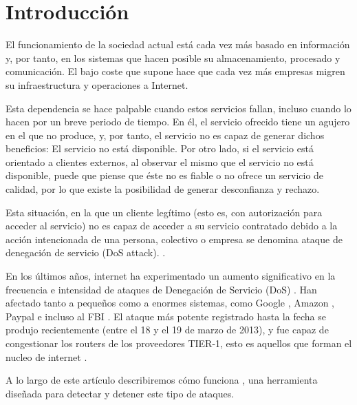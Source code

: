 \section{Introducción}\label{introduccion}
El funcionamiento de la sociedad actual está cada vez más basado en 
información y, por tanto, en los sistemas que hacen posible su almacenamiento, procesado y comunicación. El bajo coste 
que supone hace que cada vez más empresas migren su infraestructura y operaciones a Internet.

Esta dependencia se hace palpable cuando estos servicios fallan, incluso cuando lo hacen por un breve periodo de tiempo. 
En él, el servicio ofrecido tiene un agujero en el que no produce, y, por tanto, el servicio no es capaz de generar 
dichos beneficios: El servicio no está disponible. Por otro lado, si el servicio está orientado a clientes externos, al 
observar el mismo que el servicio no está disponible, puede que piense que éste no es fiable o no ofrece un servicio 
de calidad, por lo que existe la posibilidad de generar desconfianza y rechazo.

Esta situación, en la que un cliente legítimo (esto es, con autorización para acceder al servicio) no es capaz de 
acceder a su servicio contratado debido a la acción intencionada de una persona, colectivo o empresa se denomina ataque 
de denegación de servicio (DoS attack). \cite{Raghavan}.

En los últimos años, internet ha experimentado un aumento significativo en la frecuencia e intensidad de ataques de 
Denegación de Servicio (DoS) \cite{kakaspersky_2H2011_DDoS_analisis}. Han afectado tanto a pequeños como a enormes 
sistemas, como Google \cite{Google+_DDoS_attack}, Amazon \cite{Amazon_DDoS_attack}, Paypal e incluso al FBI 
\cite{FBI_DDoS_attack}. El ataque más potente registrado hasta la fecha se produjo recientemente (entre el 18 y el 19 de 
marzo de 2013), y fue capaz de congestionar los routers de los proveedores TIER-1, esto es aquellos que
forman el nucleo de internet \cite{spamhaus_DDoS_attack}. 

A lo largo de este artículo describiremos cómo funciona \redborderddos, una herramienta diseñada 
para detectar y detener este tipo de ataques.


\endinput
